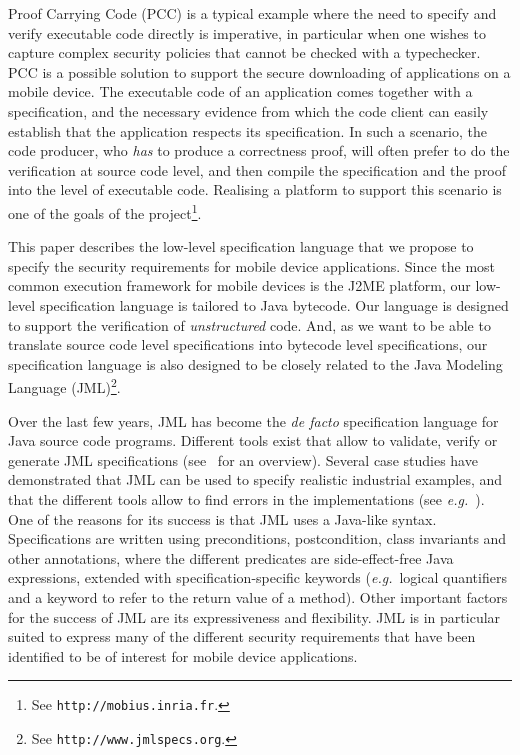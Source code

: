 Proof Carrying Code (PCC) is a typical example where the need to
specify and verify executable code directly is imperative, in
particular when one wishes to capture complex security policies that
cannot be checked with a typechecker.  PCC is a possible solution to
support the secure downloading of applications on a mobile device. The
executable code of an application comes together with a specification,
and the necessary evidence from which the code client can easily
establish that the application respects its specification. In such a
scenario, the code producer, who \emph{has} to produce a correctness
proof, will often prefer to do the verification at source code level,
and then compile the specification and the proof into the level of
executable code. Realising a platform to support this scenario is one
of the goals of the \mobius project\footnote{See
\texttt{http://mobius.inria.fr}.}. 

This paper describes the low-level specification language that we
propose to specify the security requirements for mobile device
applications. Since the most common execution framework for mobile
devices is the J2ME platform, our low-level specification language is
tailored to Java bytecode. Our language is designed to support the
verification of \emph{unstructured} code. And, as we want to be able to
translate source code level specifications into bytecode level
specifications, our specification language is also designed to be
closely related to the Java Modeling Language (JML)\footnote{See
\texttt{http://www.jmlspecs.org}.}.


Over the last few years, JML has become the \emph{de facto}
specification language for Java source code programs. Different tools
exist that allow to validate, verify or generate JML specifications
(see~\cite{BurdyCCEKLLP05} for an overview). Several case studies have
demonstrated that JML can be used to specify realistic industrial
examples, and that the different tools allow to find errors in the
implementations (see \emph{e.g.}~\cite{BreunesseCHJ04}). One of the
reasons for its success is that JML uses a Java-like
syntax. Specifications are written using preconditions, postcondition,
class invariants and other annotations, where the different predicates
are side-effect-free Java expressions, extended with
specification-specific keywords (\emph{e.g.}\ logical quantifiers and
a keyword to refer to the return value of a method). Other important
factors for the success of JML are its expressiveness and
flexibility. JML is in particular suited to express many of the
different security requirements that have been identified to be of
interest for mobile device applications.%


